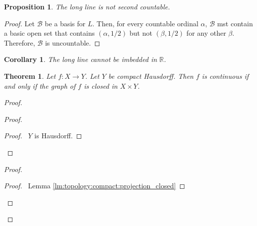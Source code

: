 \documentclass{report}
\let\qed\relax
\newtheorem{prop}[lm]{Proposition}
\newtheorem{thm}[lm]{Theorem}
\newtheorem{cor}{Corollary}[lm]
\theoremstyle{definition}
\begin{document}
  \begin{prop}
    The long line is not second countable.
  \end{prop}

  \begin{proof}
    \pf Let $\mathcal{B}$ be a basis for $L$. Then, for every countable ordinal
    $\alpha$, $\mathcal{B}$ mst contain a basic open set that contains
    $(\alpha, 1/2)$ but not $(\beta, 1/2)$ for any other $\beta$. Therefore,
    $\mathcal{B}$ is uncountable. \qed
  \end{proof}

  \begin{cor}
    The long line cannot be imbedded in $\mathbb{R}$.
  \end{cor}

  \begin{thm}
    Let $f : X \rightarrow Y$. Let $Y$ be compact Hausdorff. Then $f$ is
    continuous if and only if the graph of $f$ is closed in $X \times Y$.
  \end{thm}

  \begin{proof}
    \pf
    \begin{proof}
      \begin{proof}
        \pf\ $Y$ is Hausdorff.
      \end{proof}
      \qedstep
    \end{proof}
    \begin{proof}
      \begin{proof}
        \pf\ Lemma \ref{lm:topology:compact:projection_closed}
      \end{proof}
      \qedstep
    \end{proof}
    \qed
  \end{proof}
\end{document}
